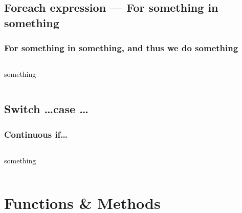 \documentclass[en, 11pt, xcolor=dvipsnames]{beamer}
\begin{document}
\subsection{Foreach expression --- For something in something}
\begin{frame}[fragile]
	\frametitle{For something in something, and thus we do something}

	\begin{columns}[c]
		\begin{column}{0.9\textwidth}
			something


		\end{column}
	\end{columns}

\end{frame}

\subsection{Switch \dots case \dots}
\begin{frame}
	\frametitle{Continuous if\dots}

	\begin{columns}
		\begin{column}{0.98\textwidth}
			something

		\end{column}
	\end{columns}
\end{frame}

\section{Functions \& Methods}
\end{document}

